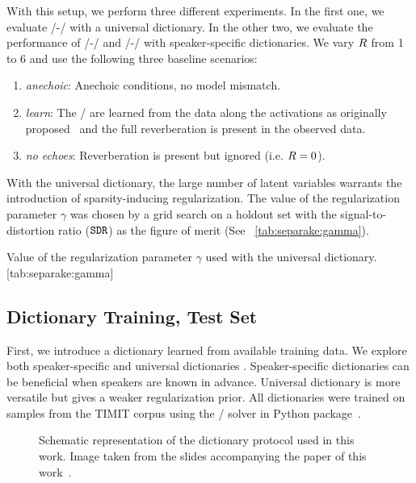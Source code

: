 \mynewline
With this setup, we perform three different experiments.
In the first one, we evaluate \MU/-\NMF/ with a universal dictionary.
In the other two, we evaluate the performance of \MU/-\NMF/ and \EM/-\NMF/ with speaker-specific dictionaries.
We vary $R$ from 1 to 6 and use the following three baseline scenarios:
\begin{enumerate}
\item \textit{anechoic}: Anechoic conditions, no model mismatch.
\item \textit{learn}: The \RTFs/ are learned from the data along the activations as originally proposed~ and the full reverberation is present in the observed data.
\item \textit{no echoes}: Reverberation is present but ignored (i.e. $R=0$).
\end{enumerate}
With the universal dictionary, the large number of latent variables warrants the introduction of sparsity-inducing regularization.
The value of the regularization parameter $\gamma$ was chosen by a grid search on a holdout set with the signal-to-distortion ratio ($\mathtt{SDR}$) as the figure of merit  (See ~\cref{tab:separake:gamma}).

\begin{table}
    \begin{sidecaption}[]{
        Value of the regularization parameter $\gamma$ used with the universal dictionary.
        }[tab:separake:gamma]
        \centering
        \small
        
    \end{sidecaption}
\end{table}


\subsection{Dictionary Training, Test Set}\label{subsec:separake:dictionary}
First, we introduce a dictionary learned from available training data.
We explore both speaker-specific and universal dictionaries .
Speaker-specific dictionaries can be beneficial when speakers are known in advance.
Universal dictionary is more versatile but gives a weaker regularization prior.
All dictionaries were trained on samples from the TIMIT corpus  using the \NMF/ solver in  Python package~.

\begin{figure}[h]
    \begin{fullwidth}
    \centering
    \hfill
        \caption{Schematic representation of the dictionary protocol used in this work.
        Image taken from the slides accompanying the paper of this work~.}
    \label{fig:separake:results}
    \end{fullwidth}
\end{figure}


